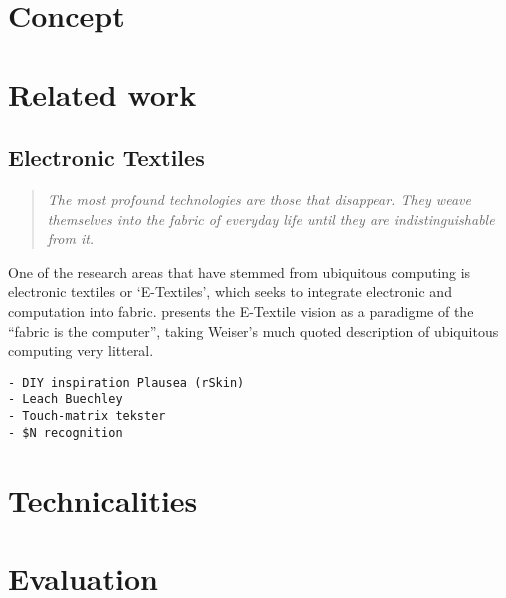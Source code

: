 \section{Concept}
\section{Related work}
\subsection{Electronic Textiles}
\begin{quotation}
\emph{The most profound technologies are those that disappear. They weave themselves into the fabric of everyday life until they are indistinguishable from it. \cite{weiser1991computer}	}
\end{quotation}
One of the research areas that have stemmed from ubiquitous computing is electronic textiles or `E-Textiles', which seeks to integrate electronic and computation into fabric.
\citet{park2002wearable} presents the E-Textile vision as a paradigme of the ``fabric is the computer'', taking Weiser's much quoted description of ubiquitous computing very litteral.

\begin{verbatim}
- DIY inspiration Plausea (rSkin)
- Leach Buechley
- Touch-matrix tekster
- $N recognition
\end{verbatim}
\section{Technicalities}
\section{Evaluation}
